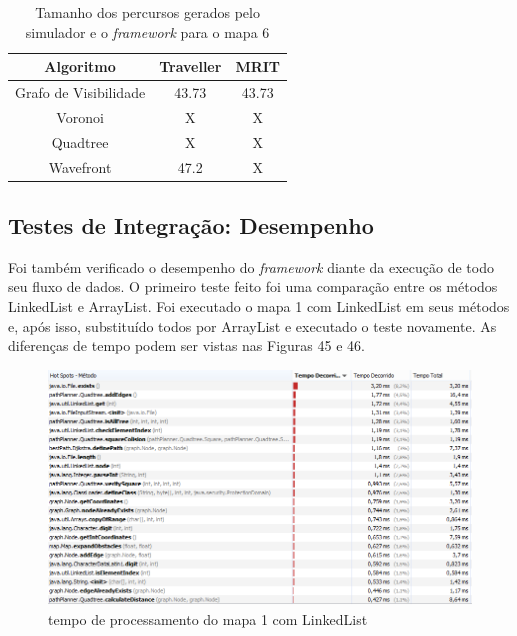 \begin{table}[H]
	\centering
	\label{tab06}
	\caption{Tamanho dos percursos gerados pelo simulador e o \textit{framework} para o mapa 6}
	\begin{tabular}{ccc}
		\toprule
		\textbf{Algoritmo} & \textbf{Traveller} & \textbf{MRIT} \\
		\midrule
Grafo de Visibilidade & 43.73   & 43.73 \\
Voronoi 				  & X      & X \\
Quadtree				  & X      & X \\
Wavefront             & 47.2    & X  \\
		\bottomrule
	\end{tabular}
\end{table}

\subsection{Testes de Integração: Desempenho}

Foi também verificado o desempenho do \textit{framework} diante da execução de todo seu fluxo de dados. O primeiro teste feito foi uma comparação entre os métodos LinkedList e ArrayList. Foi executado o mapa 1 com LinkedList em seus métodos e, após isso, substituído todos por ArrayList e executado o teste novamente. As diferenças de tempo podem ser vistas nas Figuras 45 e 46.

\begin{figure}[h]
	\centering
	\label{fig45}
		\includegraphics[keepaspectratio=true,scale=0.6]{figuras/link.PNG}
	\caption{tempo de processamento do mapa 1 com LinkedList}
\end{figure}

